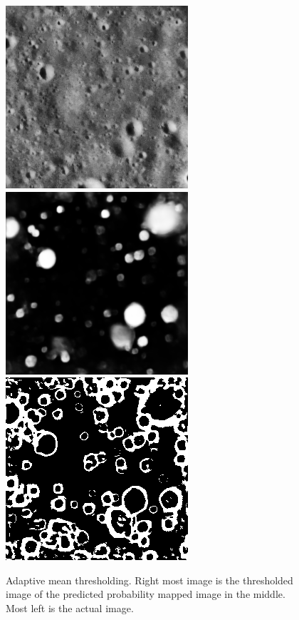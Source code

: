 \documentclass[11pt]{article}
\begin{document}
\begin{figure}[H]
	\includegraphics[width=.3\textwidth]{files/results/26.png}\hfill	
	\includegraphics[width=.3\textwidth]{files/results/26_predict.png}\hfill
	\includegraphics[width=.3\textwidth]{files/results/adaptiveMean_mean.png}\hfill
	\caption{Adaptive mean thresholding. Right most image is the thresholded image of the predicted probability mapped image in the middle. Most left is the actual image.}
	\label{Adaptive mean thresholding}
\end{figure}
\end{document}
